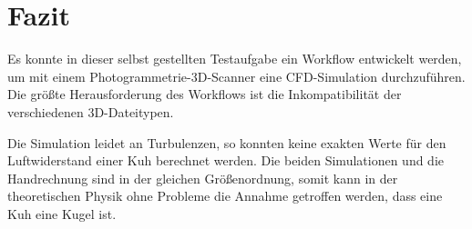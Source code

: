 \documentclass[a4paper,12pt]{article}
\begin{document}
\section{Fazit}
Es konnte in dieser selbst gestellten Testaufgabe ein Workflow entwickelt werden, um mit einem Photogrammetrie-3D-Scanner eine CFD-Simulation durchzuführen. Die größte Herausforderung des Workflows ist die Inkompatibilität der verschiedenen 3D-Dateitypen.

Die Simulation leidet an Turbulenzen, so konnten keine exakten Werte für den Luftwiderstand einer Kuh berechnet werden. Die beiden Simulationen und die Handrechnung sind in der gleichen Größenordnung, somit kann in der theoretischen Physik ohne Probleme die Annahme getroffen werden, dass eine Kuh eine Kugel ist.
\end{document}

